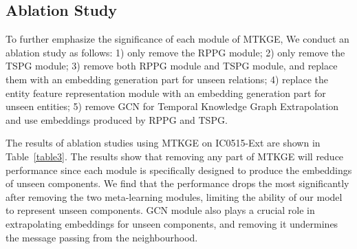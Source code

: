 \documentclass[sigconf]{acmart}
\begin{document}
\subsection{Ablation Study} 



\par
To further emphasize the significance of each module of MTKGE, We conduct an ablation study as follows: 1) only remove the RPPG module; 2) only remove the TSPG module; 3) remove both RPPG module and TSPG module, and replace them with an embedding generation part for unseen relations; 4) replace the entity feature representation module with an embedding generation part for unseen entities; 5) remove GCN for Temporal Knowledge Graph Extrapolation and use embeddings produced by RPPG and TSPG.



\par
The results of ablation studies using MTKGE on IC0515-Ext are shown in Table~\ref{table3}. The results show that removing any part of MTKGE will reduce performance since each module is specifically designed  to produce the embeddings of unseen components. We find that the performance drops the most significantly after removing the two meta-learning modules, limiting the ability of our model to represent unseen components. GCN module also plays a crucial role in extrapolating embeddings for unseen components, and removing it undermines the message passing from the neighbourhood.






\begin{table}[t]
\centering
{}
\caption{\label{table3}Ablation study of MTKGE on IC0515-Ext. \emph{w/o Both} is for removing RPPG and TSPG together. (\% for Hits@1)}
\vspace{-0.8cm}
\end{table}
\end{document}
